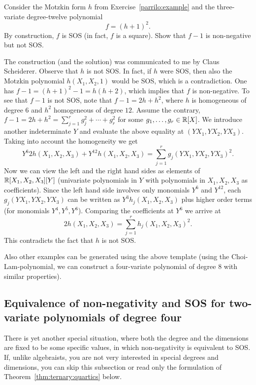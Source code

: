 \begin{exercise}
	Consider the Motzkin form $h$ from Exercise~\ref{parrilo:example} and the three-variate degree-twelve polynomial 
	\[
		f = (h+1)^2.
	\]
	By construction, $f$ is SOS (in fact, $f$ is a square). Show that $f-1$ is non-negative but not SOS. 
\end{exercise}
\begin{solution}
	The construction (and the solution) was communicated to me by Claus Scheiderer. 
	Observe that $h$ is not SOS. In fact, if $h$ were SOS, then also the Motzkin polynomial $h(X_1,X_2,1)$ would be SOS, which is a contradiction. One has $f - 1= (h+1)^2 - 1 = h (h+2)$, which implies that $f$ is non-negative. To see that $f-1$ is not SOS, note that $f- 1= 2 h + h^2$, where $h$ is homogeneous of degree $6$ and $h^2$ homogeneous of degree $12$. Assume the contrary, $f-1 = 2 h + h^2 = \sum_{j=1}^r g_j^2 + \cdots + g_r^2$ for some $g_1,\ldots,g_r \in \mathbb{R}[X]$. We introduce another indeterminate $Y$  and evaluate the above equality at $(Y X_1, Y X_2, Y X_3)$. Taking into account the homogeneity we get
	\[
		Y^6 2 h(X_1,X_2,X_3) + Y^{12} h(X_1,X_2,X_3) = \sum_{j=1}^r g_j(Y X_1, Y X_2, Y X_3)^2. 
	\]
	Now we can view the left and the right hand sides as elements of $\mathbb{R}[X_1,X_2,X_3][Y]$ (univariate polynomials in $Y$ with polynomials in $X_1, X_2, X_3$ as coefficients). Since the left hand side involves only monomials $Y^6$ and $Y^{12}$,  each $g_j(Y X_1, Y X_2, Y X_3)$ can be written as $Y^3 h_j(X_1,X_2,X_3)$ plus higher order terms (for monomials $Y^4,Y^5,Y^6$). Comparing the coefficients at $Y^6$ we arrive at 
	\[
		2 h(X_1,X_2,X_3) = \sum_{j=1}^r h_j(X_1,X_2,X_3)^2.
	\]
	This contradicts the fact that $h$ is not SOS.
\end{solution}

Also other examples can be generated using the above template (using the Choi-Lam-polynomial, we can construct a four-variate polynomial of degree $8$ with similar properties).

\subsection{Equivalence of non-negativity and SOS for two-variate polynomials of degree four}

There is yet another special situation, where both the degree and the dimensions are fixed to be some specific values, in which non-negativity is equivalent to SOS. If, unlike algebraists, you are not very interested in special degrees and dimensions, you can skip this subsection or read only the formulation of Theorem~\ref{thm:ternary:quartics} below. 

